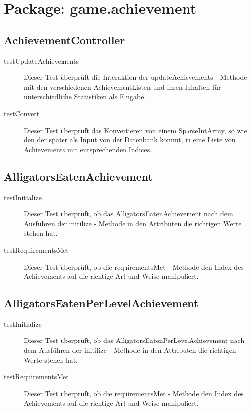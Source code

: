 \section{Package: game.achievement}

\subsection{AchievementController}

\begin{description}

\item[testUpdateAchievements]
Dieser Test überprüft die Interaktion der updateAchievements - Methode mit den verschiedenen AchievementListen und ihren Inhalten für unterschiedliche Statistiken als Eingabe. 

\item[testConvert]
Dieser Test überprüft das Konvertieren von einem SparseIntArray, so wie den der später als Input von der Datenbank kommt, in eine Liste von Achievements mit entsprechenden Indices.

\end{description}

\subsection{AlligatorsEatenAchievement}

\begin{description}
\item[testInitialize]
Dieser Test überprüft, ob das AlligatorsEatenAchievement nach dem Ausführen der initilize - Methode in den Attributen die richtigen Werte stehen hat.

\item[testRequirementsMet]
Dieser Test überprüft, ob die requirementsMet - Methode den Index des Achievements auf die richtige Art und Weise manipuliert.

\end{description}

\subsection{AlligatorsEatenPerLevelAchievement}

\begin{description}
\item[testInitialize]
Dieser Test überprüft, ob das AlligatorsEatenPerLevelAchievement nach dem Ausführen der initilize - Methode in den Attributen die richtigen Werte stehen hat.

\item[testRequirementsMet]
Dieser Test überprüft, ob die requirementsMet - Methode den Index des Achievements auf die richtige Art und Weise manipuliert.

\end{description}

